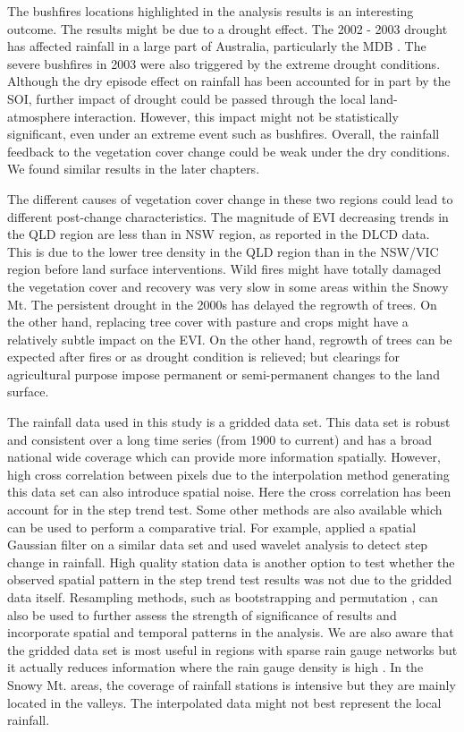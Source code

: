 \documentclass[draft,linenumbers]{agujournal}
\begin{document}
\begin{article}
The bushfires locations highlighted in the analysis results is an interesting outcome. The results might be due to a drought effect. The 2002 - 2003 drought has affected rainfall in a large part of Australia, particularly the MDB \citep{Nicholls2004}. The severe bushfires in 2003 were also triggered by the extreme drought conditions. Although the dry episode effect on rainfall has been accounted for in part by the SOI, further impact of drought could be passed through the local land-atmosphere interaction. However, this impact might not be statistically significant, even under an extreme event such as bushfires. Overall, the rainfall feedback to the vegetation cover change could be weak under the dry conditions. We found similar results in the later chapters.

The different causes of vegetation cover change in these two regions could lead to different post-change characteristics. The magnitude of EVI decreasing trends in the QLD region are less than in NSW region, as reported in the DLCD data. This is due to the lower tree density in the QLD region than in the NSW/VIC region before land surface interventions. Wild fires might have totally damaged the vegetation cover and recovery was very slow in some areas within the Snowy Mt. The persistent drought in the 2000s \citep{Howden2012} has delayed the regrowth of trees. On the other hand, replacing tree cover with pasture and crops might have a relatively subtle impact on the EVI. On the other hand, regrowth of trees can be expected after fires or as drought condition is relieved; but clearings for agricultural purpose impose permanent or semi-permanent changes to the land surface.

The rainfall data used in this study is a gridded data set. This data set is robust and consistent over a long time series (from 1900 to current) and has a broad national wide coverage which can provide more information spatially. However, high cross correlation between pixels due to the interpolation method generating this data set can also introduce spatial noise. Here the cross correlation has been account for in the step trend test. Some other methods are also available which can be used to perform a comparative trial. For example, \citet{Narisma2007} applied a spatial Gaussian filter on a similar data set and used wavelet analysis to detect step change in rainfall. High quality station data is another option to test whether the observed spatial pattern in the step trend test results was not due to the gridded data itself. Resampling methods, such as bootstrapping and permutation \citep{Wilks1997,Kundzewicz2004,Westra2013}, can also be used to further assess the strength of significance of results and incorporate spatial and temporal patterns in the analysis. We are also aware that the gridded data set is most useful in regions with sparse rain gauge networks but it actually reduces information where the rain gauge density is high \citep{Jones2009}. In the Snowy Mt. areas, the coverage of rainfall stations is intensive but they are mainly located in the valleys. The interpolated data might not best represent the local rainfall.


\end{article}
\end{document}
